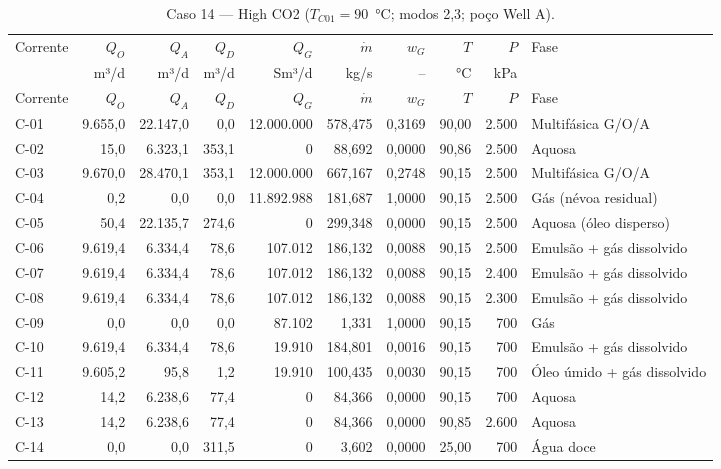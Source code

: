 \documentclass[11pt,a4paper]{article}
\numberwithin{equation}{section}
\numberwithin{table}{section}
\numberwithin{figure}{section}
\begin{document}
{\footnotesize\setlength{\tabcolsep}{3pt}\begin{longtable}{lrrrrrrrrL{2.5cm}}
\caption{Caso 14 --- High CO2 ($T_{C01}=90$~°C; modos 2,3; poço Well A).}\\\toprule
Corrente & $Q_O$ & $Q_A$ & $Q_D$ & $Q_G$ & $\dot m$ & $w_G$ & $T$ & $P$ & Fase\\ & m³/d & m³/d & m³/d & Sm³/d & kg/s & -- & °C & kPa & \\\midrule\endfirsthead
\toprule Corrente & $Q_O$ & $Q_A$ & $Q_D$ & $Q_G$ & $\dot m$ & $w_G$ & $T$ & $P$ & Fase\\\midrule\endhead
C-01 & 9.655,0 & 22.147,0 & 0,0 & 12.000.000 & 578,475 & 0,3169 & 90,00 & 2.500 & {\scriptsize Multifásica G/O/A}\\
C-02 & 15,0 & 6.323,1 & 353,1 & 0 & 88,692 & 0,0000 & 90,86 & 2.500 & {\scriptsize Aquosa}\\
C-03 & 9.670,0 & 28.470,1 & 353,1 & 12.000.000 & 667,167 & 0,2748 & 90,15 & 2.500 & {\scriptsize Multifásica G/O/A}\\
C-04 & 0,2 & 0,0 & 0,0 & 11.892.988 & 181,687 & 1,0000 & 90,15 & 2.500 & {\scriptsize Gás (névoa residual)}\\
C-05 & 50,4 & 22.135,7 & 274,6 & 0 & 299,348 & 0,0000 & 90,15 & 2.500 & {\scriptsize Aquosa (óleo disperso)}\\
C-06 & 9.619,4 & 6.334,4 & 78,6 & 107.012 & 186,132 & 0,0088 & 90,15 & 2.500 & {\scriptsize Emulsão + gás dissolvido}\\
C-07 & 9.619,4 & 6.334,4 & 78,6 & 107.012 & 186,132 & 0,0088 & 90,15 & 2.400 & {\scriptsize Emulsão + gás dissolvido}\\
C-08 & 9.619,4 & 6.334,4 & 78,6 & 107.012 & 186,132 & 0,0088 & 90,15 & 2.300 & {\scriptsize Emulsão + gás dissolvido}\\
C-09 & 0,0 & 0,0 & 0,0 & 87.102 & 1,331 & 1,0000 & 90,15 & 700 & {\scriptsize Gás}\\
C-10 & 9.619,4 & 6.334,4 & 78,6 & 19.910 & 184,801 & 0,0016 & 90,15 & 700 & {\scriptsize Emulsão + gás dissolvido}\\
C-11 & 9.605,2 & 95,8 & 1,2 & 19.910 & 100,435 & 0,0030 & 90,15 & 700 & {\scriptsize Óleo úmido + gás dissolvido}\\
C-12 & 14,2 & 6.238,6 & 77,4 & 0 & 84,366 & 0,0000 & 90,15 & 700 & {\scriptsize Aquosa}\\
C-13 & 14,2 & 6.238,6 & 77,4 & 0 & 84,366 & 0,0000 & 90,85 & 2.600 & {\scriptsize Aquosa}\\
C-14 & 0,0 & 0,0 & 311,5 & 0 & 3,602 & 0,0000 & 25,00 & 700 & {\scriptsize Água doce}\\

\end{longtable}}
\end{document}
